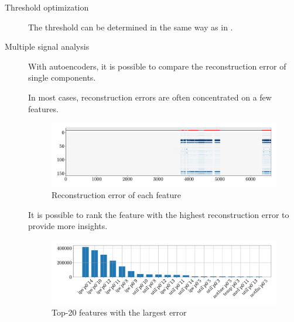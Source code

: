 \begin{description}
    \item[Threshold optimization]
        The threshold can be determined in the same way as in .

    \item[Multiple signal analysis]
        With autoencoders, it is possible to compare the reconstruction error of single components. 

        \begin{remark}
            In most cases, reconstruction errors are often concentrated on a few features.

            \begin{figure}[H]
                \centering
                \includegraphics[width=0.8\linewidth]{./img/_ad_hpc_multi_signal.pdf}
                \caption{Reconstruction error of each feature}
            \end{figure}
        \end{remark}

        \begin{remark}
            It is possible to rank the feature with the highest reconstruction error to provide more insights.

            \begin{figure}[H]
                \centering
                \includegraphics[width=0.8\linewidth]{./img/_ad_hpc_multi_signal_rank.pdf}
                \caption{Top-20 features with the largest error}
            \end{figure}
        \end{remark}
\end{description}